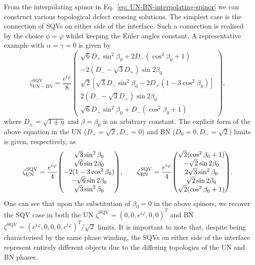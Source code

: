 From the interpolating spinor in Eq.~\eqref{eq: UN-BN-interpolating-spinor} we
can construct various topological defect crossing solutions.
The simplest case is the connection of SQVs on either side of the interface.
Such a connection is realised by the choice \(\phi = \varphi \) whilst keeping
the Euler angles constant.
A representative example with \(\alpha = \gamma = 0\) is given by
\begin{equation}
    \zeta^\mathrm{SQV}_\mathrm{UN-BN} =
    \frac{e^{i\varphi}}{8}\begin{pmatrix}
        \sqrt{6} D_+ \sin ^2\beta _0 + 2D_- \left(\cos^2\beta _0+1\right) \\
        -2 \left(D_--\sqrt{3} D_+\right) \sin 2 \beta _0                  \\
        \sqrt{2}\left[ \sqrt{3} D_- \sin ^2\beta _0 -2D_+
        \left(1-3 \cos^2 \beta _0\right)\right]                           \\
        2 \left(D_--\sqrt{3} D_+\right) \sin 2 \beta _0                   \\
        \sqrt{6} D_+ \sin ^2\beta _0+D_- \left(\cos^2\beta _0+1\right)
    \end{pmatrix},
    \label{eq: UN-BN-SQV-SQV}
\end{equation}
where \(D_{\pm} = \sqrt{1 \pm \eta}\) and \(\beta=\beta_0\) is an arbitrary
constant.
The explicit form of the above equation in the UN
(\(D_+ = \sqrt{2}, D_- = 0\)) and BN (\(D_0 = 0, D_- = \sqrt{2}\)) limits
is given, respectively, as
\begin{equation}
    \zeta_\mathrm{UN}^\mathrm{SQV} =  \frac{e^{i\varphi}}{4}\mqty(
    \sqrt{3}\sin^2\beta_0 \\
    \sqrt{6}\sin2\beta_0 \\
    -2(1 - 3\cos^2\beta_0) \\
    -\sqrt{6}\sin2\beta_0 \\
    \sqrt{3}\sin^2\beta_0
    ), \qquad
    \zeta_\mathrm{BN}^\mathrm{SQV} =  \frac{e^{i\varphi}}{4}\mqty(
    \sqrt{2}(\cos^2\beta_0 + 1) \\
    -\sqrt{2}\sin2\beta_0 \\
    2\sqrt{3}\sin^2\beta_0 \\
    \sqrt{2}\sin2\beta_0 \\
    \sqrt{2}(\cos^2\beta_0 + 1)
    ).
\end{equation}
One can see that upon the substitution of \(\beta_0 = 0\) in the above spinors,
we recover the SQV case in both the UN
\(\zeta^\mathrm{SQV} = {(0,0,e^{i\varphi},0,0)}^T\) and BN
\(\zeta^\mathrm{SQV} = {(e^{i\varphi},0,0,0,e^{i\varphi})}^T/\sqrt{2}\) limits.
It is important to note that, despite being characterised by the same phase
winding, the SQVs on either side of the interface represent entirely different
objects due to the differing topologies of the UN and BN phases.

